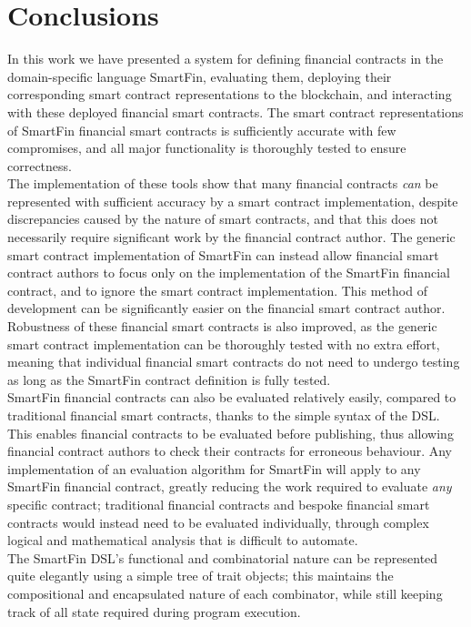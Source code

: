 \chapter{Conclusions}

In this work we have presented a system for defining financial contracts in the domain-specific language SmartFin, evaluating them, deploying their corresponding smart contract representations to the blockchain, and interacting with these deployed financial smart contracts. The smart contract representations of SmartFin financial smart contracts is sufficiently accurate with few compromises, and all major functionality is thoroughly tested to ensure correctness. \\

The implementation of these tools show that many financial contracts \textit{can} be represented with sufficient accuracy by a smart contract implementation, despite discrepancies caused by the nature of smart contracts, and that this does not necessarily require significant work by the financial contract author. The generic smart contract implementation of SmartFin can instead allow financial smart contract authors to focus only on the implementation of the SmartFin financial contract, and to ignore the smart contract implementation. This method of development can be significantly easier on the financial smart contract author. Robustness of these financial smart contracts is also improved, as the generic smart contract implementation can be thoroughly tested with no extra effort, meaning that individual financial smart contracts do not need to undergo testing as long as the SmartFin contract definition is fully tested. \\

SmartFin financial contracts can also be evaluated relatively easily, compared to traditional financial smart contracts, thanks to the simple syntax of the DSL. This enables financial contracts to be evaluated before publishing, thus allowing financial contract authors to check their contracts for erroneous behaviour. Any implementation of an evaluation algorithm for SmartFin will apply to any SmartFin financial contract, greatly reducing the work required to evaluate \textit{any} specific contract; traditional financial contracts and bespoke financial smart contracts would instead need to be evaluated individually, through complex logical and mathematical analysis that is difficult to automate. \\

The SmartFin DSL's functional and combinatorial nature can be represented quite elegantly using a simple tree of trait objects; this maintains the compositional and encapsulated nature of each combinator, while still keeping track of all state required during program execution. \\

